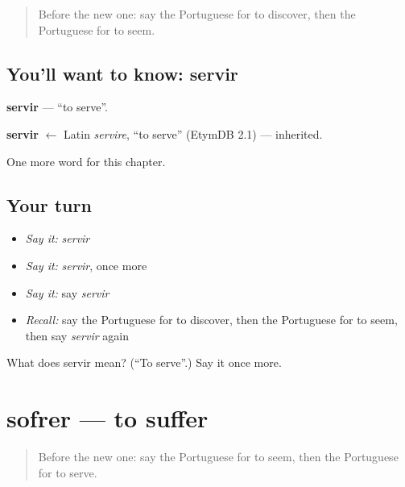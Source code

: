 \label{lesson:PT-C206-servir}



\begin{quote}
Before the new one: say the Portuguese for to discover, then the Portuguese for to seem.
\end{quote}

\subsection*{You'll want to know: servir}
\textbf{servir} — \textquotedblleft{}to serve\textquotedblright{}.

\begin{cousinweb}
\textbf{servir} $\leftarrow$ Latin \emph{servire}, \textquotedblleft{}to serve\textquotedblright{} (EtymDB 2.1) — inherited.
\end{cousinweb}

\begin{grammarlens}[title={What you've built}]
One more word for this chapter.
\end{grammarlens}

\subsection*{Your turn}
\begin{itemize}
\raggedright
  \item \emph{Say it:} \emph{servir}
  \item \emph{Say it:} \emph{servir}, once more
  \item \emph{Say it:} say \emph{servir}
  \item \emph{Recall:} say the Portuguese for to discover, then the Portuguese for to seem, then say \emph{servir} again
\end{itemize}

\begin{tcolorbox}[breakable,colback=teal!4,colframe=teal!35!black,title={Before you move on}]
What does servir mean? (\textquotedblleft{}To serve\textquotedblright{}.) Say it once more.
\end{tcolorbox}
\section[sofrer]{sofrer — to suffer}

\label{lesson:PT-C206-sofrer}



\begin{quote}
Before the new one: say the Portuguese for to seem, then the Portuguese for to serve.
\end{quote}

